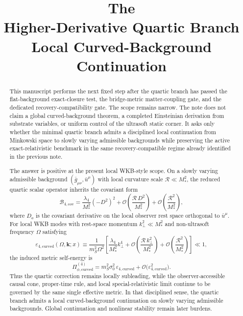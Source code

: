 \documentclass[11pt]{article}
\title{\textbf{The \TheoryName{}}\\[0.4em]
\large Higher-Derivative Quartic Branch Local Curved-Background Continuation}
\author{}
\date{}
\begin{document}
\maketitle

\begin{abstract}
This manuscript performs the next fixed step after the quartic branch has passed the flat-background exact-closure test, the bridge-metric matter-coupling gate, and the dedicated recovery-compatibility gate. The scope remains narrow. The note does not claim a global curved-background theorem, a completed Einsteinian derivation from substrate variables, or uniform control of the ultrasoft static corner. It asks only whether the minimal quartic branch admits a disciplined local continuation from Minkowski space to slowly varying admissible backgrounds while preserving the active exact-relativistic benchmark in the same recovery-compatible regime already identified in the previous note.

The answer is positive at the present local WKB-style scope. On a slowly varying admissible background \((\bar g_{\mu\nu},\bar u^\mu)\) with local curvature scale \(\mathcal R\ll M_*^2\), the reduced quartic scalar operator inherits the covariant form
\[
\mathcal B_{4,\mathrm{cov}}
=
\frac{\lambda_4}{M_*^2}(-D^2)^2
+ \mathcal O\!\left(\frac{\mathcal R\,D^2}{M_*^2}\right)
+ \mathcal O\!\left(\frac{\mathcal R^2}{M_*^2}\right),
\]
where \(D_a\) is the covariant derivative on the local observer rest space orthogonal to \(\bar u^\mu\). For local WKB modes with rest-space momentum \(k_\perp^2\ll M_*^2\) and non-ultrasoft frequency \(\Omega\) satisfying
\[
\varepsilon_{4,\mathrm{curved}}(\Omega,\mathbf{k};x)
\equiv
\frac{1}{m_S^2\Omega^2}
\left[
\frac{\lambda_4}{M_*^2}k_\perp^4
+ \mathcal O\!\left(\frac{\mathcal R\,k_\perp^2}{M_*^2}\right)
+ \mathcal O\!\left(\frac{\mathcal R^2}{M_*^2}\right)
\right]
\ll 1,
\]
the induced metric self-energy is
\[
\Pi_{\phi,\mathrm{curved}}^{(4)}
=
m_S^2\sigma_0^2\,\varepsilon_{4,\mathrm{curved}}
+ \mathcal O\!\bigl(\varepsilon_{4,\mathrm{curved}}^2\bigr).
\]
Thus the quartic correction remains locally subleading, while the observer-accessible causal cone, proper-time rule, and local special-relativistic limit continue to be governed by the same single effective metric. In that disciplined sense, the quartic branch admits a local curved-background continuation on slowly varying admissible backgrounds. Global continuation and nonlinear stability remain later burdens.
\end{abstract}
\end{document}

